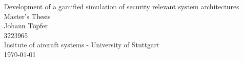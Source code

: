 \begin{titlepage}
    \begin{center}
        \Huge{Development of a gamified simulation of security relevant system architectures}\\[0.5cm]
        \Large{Master's Thesis}\\[14cm]
        \large{Johann Töpfer\\3223965\\Insitute of aircraft systems - University of Stuttgart\\\today}
    \end{center}
\end{titlepage}
\newpage